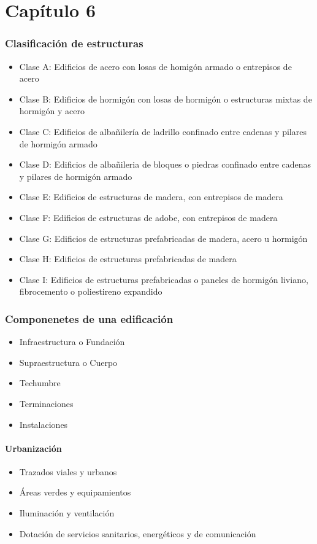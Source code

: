 \part{Capítulo 6}
\section{Clasificación de estructuras}
\begin{itemize}
    \item Clase A: Edificios de acero con losas de homigón armado o entrepisos de acero
    \item Clase B: Edificios de hormigón con losas de hormigón o estructuras mixtas de hormigón y acero
    \item Clase C: Edificios de albañilería de ladrillo confinado entre cadenas y pilares de hormigón armado
    \item Clase D: Edificios de albañileria de bloques o piedras confinado entre cadenas y pilares de hormigón armado
    \item Clase E: Edificios de estructuras de madera, con entrepisos de madera
    \item Clase F: Edificios de estructuras de adobe, con entrepisos de madera
    \item Clase G: Edificios de estructuras prefabricadas de madera, acero u hormigón
    \item Clase H: Edificios de estructuras prefabricadas de madera
    \item Clase I: Edificios de estructuras prefabricadas o paneles de hormigón liviano, fibrocemento o poliestireno expandido
\end{itemize}

\section{Componenetes de una edificación}
\begin{itemize}
    \item Infraestructura o Fundación
    \item Supraestructura o Cuerpo
    \item Techumbre
    \item Terminaciones
    \item Instalaciones
\end{itemize}

\subsection{Urbanización}
\begin{itemize}
    \item Trazados viales y urbanos
    \item Áreas verdes y equipamientos
    \item Iluminación y ventilación
    \item Dotación de servicios sanitarios, energéticos y de comunicación
\end{itemize}
